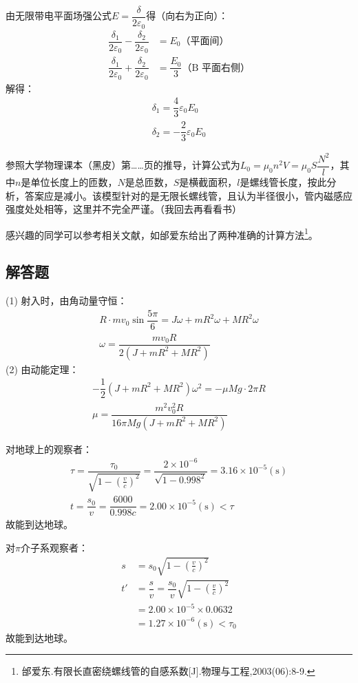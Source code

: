 由无限带电平面场强公式$E=\dfrac{\delta}{2\varepsilon_0}$得（向右为正向）：
\begin{align*}
\dfrac{\delta_1}{2\varepsilon_0}-\dfrac{\delta_2}{2\varepsilon_0}&=E_0\text{（平面间）}\\
\dfrac{\delta_1}{2\varepsilon_0}+\dfrac{\delta_2}{2\varepsilon_0}&=\dfrac{E_0}{3}\text{（B
	平面右侧）}
\end{align*}
解得：
\begin{gather*}
\delta_1=\dfrac{4}{3}\varepsilon_0E_0\\
\delta_2=-\dfrac{2}{3}\varepsilon_0E_0
\end{gather*}



\solve
参照大学物理课本（黑皮）第……页的推导，计算公式为$L_0=\mu_0n^2V=\mu_0S\dfrac{N^2}{l}$，其中$n$是单位长度上的匝数，$N$是总匝数，$S$是横截面积，$l$是螺线管长度，按此分析，答案应是减小。该模型针对的是无限长螺线管，且认为半径很小，管内磁感应强度处处相等，这里并不完全严谨。（我回去再看看书）

感兴趣的同学可以参考相关文献，如邰爱东给出了两种准确的计算方法\footnote{邰爱东.有限长直密绕螺线管的自感系数[J].物理与工程,2003(06):8-9.}。


\subsection{解答题}
(1) 射入时，由角动量守恒：
\begin{gather*}
R\cdot mv_0\sin\dfrac{5\pi}{6}=J\omega+mR^2\omega+MR^2\omega\\
\omega=\dfrac{mv_0R}{2(J+mR^2+MR^2)}
\end{gather*}
(2) 由动能定理：
\begin{gather*}
-\dfrac{1}{2}(J+mR^2+MR^2)\omega^2=-\mu Mg\cdot 2\pi R\\
\mu=\dfrac{m^2v_0^2R}{16\pi Mg(J+mR^2+MR^2)}
\end{gather*}

对地球上的观察者：
\begin{gather*}
\tau=\dfrac{\tau_0}{\sqrt{1-{\left(\frac{v}{c}\right)}^2}}=\dfrac{2\times 10^{-6}}{\sqrt{1-0.998^2}}=3.16\times 10^{-5}(\textrm{s})\\
t=\dfrac{s_0}{v}=\dfrac{6000}{0.998c}=2.00\times 10^{-5}(\textrm{s})<\tau
\end{gather*}
故能到达地球。

对$\pi$介子系观察者：
\begin{align*}
s&=s_0\sqrt{1-{\left(\frac{v}{c}\right)}^2}\\
t'&=\dfrac{s}{v}=\dfrac{s_0}{v}\sqrt{1-{\left(\frac{v}{c}\right)}^2}\\
&=2.00\times 10^{-5}\times 0.0632\\
&=1.27\times 10^{-6}(\textrm{s})<\tau_0
\end{align*}
故能到达地球。

